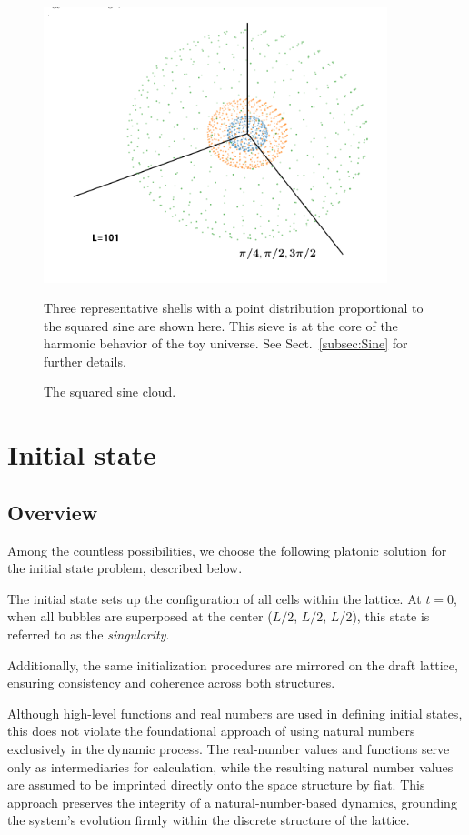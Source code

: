 \documentclass[12pt,english]{article}
\begin{document}
\begin{figure}
\centering
\includegraphics[width=10cm]{fig2}
\caption{The squared sine cloud.}
\footnotesize{Three representative shells with a point distribution proportional to the squared sine are shown here. This sieve is at the core of the harmonic behavior of the toy universe. See Sect.~\ref{subsec:Sine} for further details.}
\label{fig2}
\end{figure}


\section{Initial state}\label{initial-state}

\subsection{Overview}
Among the countless possibilities, we choose the following platonic solution for the initial state problem, described below.

The initial state sets up the configuration of all cells within the lattice. At $t=0$, when all bubbles are superposed at the center ($L/2$, $L/2$, $L$/2), this state is referred to as the \textit{singularity}.

Additionally, the same initialization procedures are mirrored on the draft lattice, ensuring consistency and coherence across both structures.

Although high-level functions and real numbers are used in defining initial states, this does not violate the foundational approach of using natural numbers exclusively in the dynamic process. The real-number values and functions serve only as intermediaries for calculation, while the resulting natural number values are assumed to be imprinted directly onto the space structure by fiat. This approach preserves the integrity of a natural-number-based dynamics, grounding the system’s evolution firmly within the discrete structure of the lattice.
\end{document}
